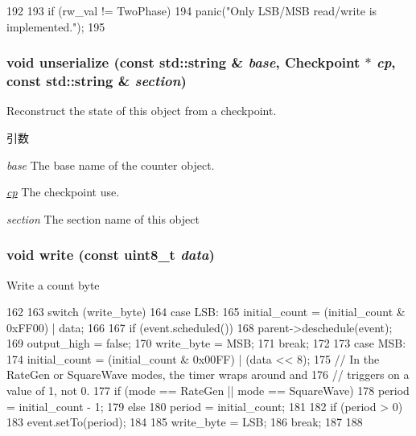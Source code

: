 \begin{DoxyCode}
192 {
193     if (rw_val != TwoPhase)
194         panic("Only LSB/MSB read/write is implemented.\n");
195 }
\end{DoxyCode}
\hypertarget{classIntel8254Timer_1_1Counter_a147c320e3d6506edf5587a40cd8e430d}{
\subsubsection[{unserialize}]{\setlength{\rightskip}{0pt plus 5cm}void unserialize (const std::string \& {\em base}, \/  {\bf Checkpoint} $\ast$ {\em cp}, \/  const std::string \& {\em section})}}
\label{classIntel8254Timer_1_1Counter_a147c320e3d6506edf5587a40cd8e430d}
Reconstruct the state of this object from a checkpoint. 
\begin{DoxyParams}{引数}
\item[{\em base}]The base name of the counter object. \item[{\em \hyperlink{namespacecp}{cp}}]The checkpoint use. \item[{\em section}]The section name of this object \end{DoxyParams}
\hypertarget{classIntel8254Timer_1_1Counter_a2bd23b2d4f41e6c765125180c3e324bd}{
\subsubsection[{write}]{\setlength{\rightskip}{0pt plus 5cm}void write (const uint8\_\-t {\em data})}}
\label{classIntel8254Timer_1_1Counter_a2bd23b2d4f41e6c765125180c3e324bd}
Write a count byte 


\begin{DoxyCode}
162 {
163     switch (write_byte) {
164       case LSB:
165         initial_count = (initial_count & 0xFF00) | data;
166 
167         if (event.scheduled())
168             parent->deschedule(event);
169         output_high = false;
170         write_byte = MSB;
171         break;
172 
173       case MSB:
174         initial_count = (initial_count & 0x00FF) | (data << 8);
175         // In the RateGen or SquareWave modes, the timer wraps around and
176         // triggers on a value of 1, not 0.
177         if (mode == RateGen || mode == SquareWave)
178             period = initial_count - 1;
179         else
180             period = initial_count;
181 
182         if (period > 0)
183             event.setTo(period);
184 
185         write_byte = LSB;
186         break;
187     }
188 }
\end{DoxyCode}


